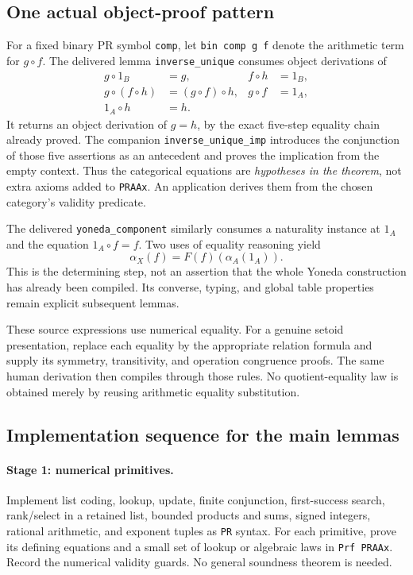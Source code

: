 \subsection{One actual object-proof pattern}

For a fixed binary PR symbol \texttt{comp}, let \texttt{bin comp g f}
denote the arithmetic term for $g\circ f$. The delivered lemma
\texttt{inverse\_unique} consumes object derivations of
\begin{align*}
 g\circ1_B&=g, & f\circ h&=1_B,\\
 g\circ(f\circ h)&=(g\circ f)\circ h, & g\circ f&=1_A,\\
 1_A\circ h&=h.
\end{align*}
It returns an object derivation of $g=h$, by the exact five-step equality
chain already proved. The companion \texttt{inverse\_unique\_imp} introduces
the conjunction of those five assertions as an antecedent and proves the
implication from the empty context. Thus the categorical equations are
\emph{hypotheses in the theorem}, not extra axioms added to \texttt{PRAAx}.
An application derives them from the chosen category's validity predicate.

The delivered \texttt{yoneda\_component} similarly consumes a naturality
instance at $1_A$ and the equation $1_A\circ f=f$. Two uses of equality
reasoning yield
\[
 \alpha_X(f)=F(f)(\alpha_A(1_A)).
\]
This is the determining step, not an assertion that the whole Yoneda
construction has already been compiled. Its converse, typing, and global
table properties remain explicit subsequent lemmas.

These source expressions use numerical equality. For a genuine setoid
presentation, replace each equality by the appropriate relation formula and
supply its symmetry, transitivity, and operation congruence proofs. The same
human derivation then compiles through those rules. No quotient-equality law
is obtained merely by reusing arithmetic equality substitution.

\subsection{Implementation sequence for the main lemmas}

\paragraph{Stage 1: numerical primitives.}
Implement list coding, lookup, update, finite conjunction, first-success
search, rank/select in a retained list, bounded products and sums, signed
integers, rational arithmetic, and exponent tuples as \texttt{PR} syntax.
For each primitive, prove its defining equations and a small set of lookup or
algebraic laws in \texttt{Prf PRAAx}. Record the numerical validity guards.
No general soundness theorem is needed.

